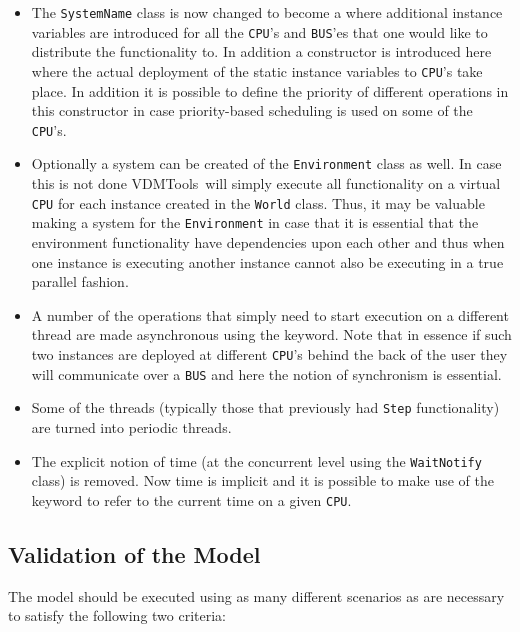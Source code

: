 \documentclass{overturerepchap}
\newcommand{\vdmtools}{VDMTools}
\begin{document}
\begin{itemize}
\item The \texttt{SystemName} class is now changed to become a
  {\bf{}} 
      where additional instance variables are introduced for all the
      \texttt{CPU}'s and \texttt{BUS}'es that one would like to distribute
      the functionality to. In addition a constructor is introduced here
      where the actual deployment of the static instance variables to
      \texttt{CPU}'s take place. In addition it is possible to define the
      priority of different operations in this constructor in case 
      priority-based scheduling is used on some of the \texttt{CPU}'s. 
\item Optionally a system can be created of the \texttt{Environment} class
      as well. In case this is not done \vdmtools\ will simply execute
      all functionality on a virtual \texttt{CPU} for each instance created in the
      \texttt{World} class. Thus, it may be valuable making a system for
      the \texttt{Environment} in case that it is essential that the 
      environment functionality have dependencies upon each other and thus
      when one instance is executing another instance cannot also be 
      executing in a true parallel fashion.  
\item A number of the operations that simply need to start execution on
      a different thread are made asynchronous using the {\bf{}}
      keyword. Note that in essence if such two instances are deployed at 
      different \texttt{CPU}'s behind the back of the user they will
      communicate over a \texttt{BUS} and here the notion of synchronism
      is essential.
\item Some of the threads (typically those that previously had \texttt{Step}
      functionality) are turned into periodic threads.
\item The explicit notion of time (at the concurrent level using the 
      \texttt{WaitNotify} class) is removed. Now time is implicit and it
      is possible to make use of the keyword {\bf{}} to refer to the
      current time on a given \texttt{CPU}.
\end{itemize}

\subsection{Validation of the Model}

The model should be executed using as many different scenarios as are
necessary to satisfy the following two criteria:
\end{document}
